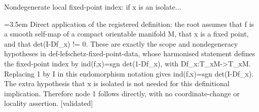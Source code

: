 \documentclass{article}
\newcommand{\step}[1]{\par\noindent\hangindent=3.5em\hangafter=1%
  \makebox[3.5em][l]{\textbf{#1.}}}
\newcommand{\steptag}[1]{\hfill{\small\textsf{[#1]}}}
\begin{document}
\begin{proofbox}{Nondegenerate local fixed-point index: if x is an isolate...}
\step{1.5} Direct application of the registered definition: the root assumes that f is a smooth self-map of a compact orientable manifold M, that x is a fixed point, and that det(I-Df\_x) != 0. These are exactly the scope and nondegeneracy hypotheses in def-lefschetz-fixed-point-data, whose harmonised statement defines the fixed-point index by ind(f,x)=sgn det(1-Df\_x), with Df\_x:T\_xM->T\_xM. Replacing 1 by I in this endomorphism notation gives ind(f,x)=sgn det(I-Df\_x). The extra hypothesis that x is isolated is not needed for this definitional implication. Therefore node 1 follows directly, with no coordinate-change or locality assertion. \steptag{validated} \\[4pt]
\end{proofbox}
\end{document}
